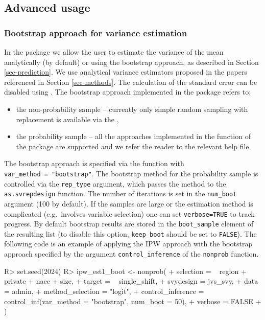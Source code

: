 \documentclass[
]{jss}
\begin{document}
\subsection{Advanced usage}\label{advanced-usage}

\subsubsection{Bootstrap approach for variance
estimation}\label{bootstrap-approach-for-variance-estimation}

In the package we allow the user to estimate the variance of the mean
analytically (by default) or using the bootstrap approach, as described
in Section \ref{sec-prediction}. We use analytical variance estimators
proposed in the papers referenced in Section \ref{sec-methods}. The
calculation of the standard error can be disabled using
. The bootstrap approach implemented in the
package refers to:

\begin{itemize}
\item the non-probability sample -- currently only simple random sampling with replacement is available via the ,
\item the probability sample -- all the approaches implemented in the  function of the  package are supported and we refer the reader to the relevant help file. 
\end{itemize}

The bootstrap approach is specified via the 
function with \texttt{var\_method\ =\ "bootstrap"}. The bootstrap method
for the probability sample is controlled via the \texttt{rep\_type}
argument, which passes the method to the \texttt{as.svrepdesign}
function. The number of iterations is set in the \texttt{num\_boot}
argument (100 by default). If the samples are large or the estimation
method is complicated (e.g.~involves variable selection) one can set
\texttt{verbose=TRUE} to track progress. By default bootstrap results
are stored in the \texttt{boot\_sample} element of the resulting list
(to disable this option, \texttt{keep\_boot} should be set to
\texttt{FALSE}). The following code is an example of applying the IPW
approach with the bootstrap approach specified by the argument
\texttt{control\_inference} of the \texttt{nonprob} function.

\begin{CodeChunk}
\begin{CodeInput}
R> set.seed(2024)
R> ipw_est1_boot <- nonprob(
+   selection = ~ region + private + nace + size,
+   target = ~ single_shift,
+   svydesign = jvs_svy,
+   data = admin,
+   method_selection = "logit",
+   control_inference = control_inf(var_method = "bootstrap", num_boot = 50),
+   verbose = FALSE
+ )
\end{CodeInput}
\end{CodeChunk}
\end{document}
